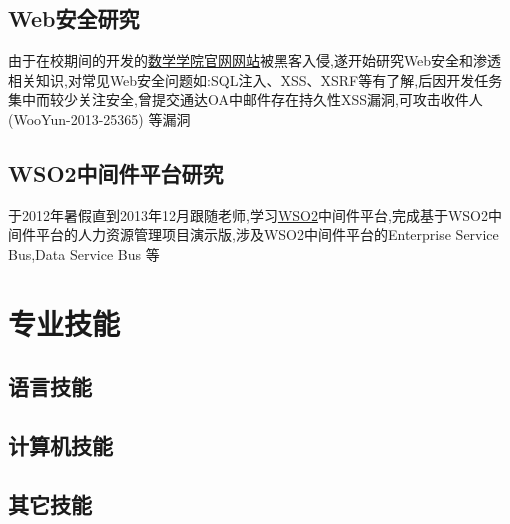 \documentclass[11pt,a4paper,kai]{moderncv}   %
\begin{document}
\begin{CJK}{UTF8}{kai}
\subsection{Web安全研究}
 由于在校期间的开发的\href{http://www.math.uestc.edu.cn}{数学学院官网网站}被黑客入侵,遂开始研究Web安全和渗透相关知识,对常见Web安全问题如:SQL注入、XSS、XSRF等有了解,后因开发任务集中而较少关注安全,曾提交通达OA中邮件存在持久性XSS漏洞,可攻击收件人(WooYun-2013-25365) 等漏洞
\subsection{WSO2中间件平台研究}
于2012年暑假直到2013年12月跟随老师,学习\href{http://www.wso2.com}{WSO2}中间件平台,完成基于WSO2中间件平台的人力资源管理项目演示版,涉及WSO2中间件平台的Enterprise Service Bus,Data Service Bus 等

\section{专业技能}
\subsection{语言技能}

\subsection{计算机技能}

\subsection{其它技能}



\end{CJK}
\end{document}
